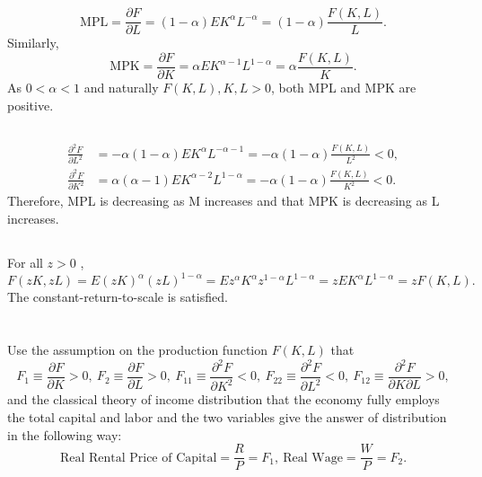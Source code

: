 \documentclass{article}
\begin{document}
\section{}
\subsection{}
\[
    \text{MPL} = \frac{\partial F}{\partial L}
    = (1 - \alpha) E K^\alpha L^{-\alpha}
    = (1 - \alpha) \frac{F(K,L)}{L} .
\]
Similarly,
\[
    \text{MPK} = \frac{\partial F}{\partial K}
    = \alpha E K^{\alpha - 1} L^{1 - \alpha}
    = \alpha \frac{F(K,L)}{K} .
\]
As $0 < \alpha < 1$ and naturally $F(K, L), K, L > 0$, both MPL and MPK are positive.

\subsection{}
\begin{align*}
    \frac{\partial^2 F}{\partial L^2}
    &= - \alpha (1 - \alpha) E K^\alpha L^{-\alpha - 1} = - \alpha (1 - \alpha) \frac{F(K,L)}{L^2}
    < 0, \\[6pt]
    \frac{\partial^2 F}{\partial K^2}
    &= \alpha (\alpha - 1) E K^{\alpha - 2} L^{1 - \alpha}
    = - \alpha (1 - \alpha) \frac{F(K,L)}{K^2} < 0.
\end{align*}
Therefore, MPL is decreasing as M increases and that MPK is decreasing as L increases.

\subsection{}
For all $z > 0$ ,
\[
    F(zK, zL) = E (zK)^\alpha (zL)^{1 - \alpha}
    = E z^\alpha K^\alpha z^{1 - \alpha} L^{1 - \alpha}
    = z E K^\alpha L^{1 - \alpha} = z F(K, L).
\]
The constant-return-to-scale is satisfied.

\section{}
Use the assumption on the production function $F(K, L)$ that
\[
    F_1 \equiv \frac{\partial F}{\partial K} > 0,\ 
    F_2 \equiv \frac{\partial F}{\partial L} > 0,\ 
    F_{11} \equiv \frac{\partial^2 F}{\partial K^2} < 0,\ 
    F_{22} \equiv \frac{\partial^2 F}{\partial L^2} < 0,\ 
    F_{12} \equiv \frac{\partial^2 F}{\partial K \partial L} > 0, 
\]
and the classical theory of income distribution that the economy fully employs the total capital and labor and the two variables give the answer of distribution in the following way:
\[
    \text{Real Rental Price of Capital}
    = \frac{R}{P} = F_1,\ 
    \text{Real Wage}
    = \frac{W}{P} = F_2.
\]
\end{document}
